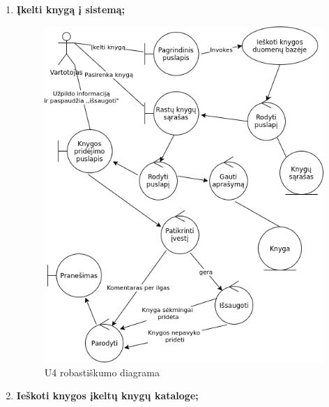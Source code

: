\documentclass{VUMIFPSkursinis}
\begin{document}
\begin{enumerate}[label=\textbf{U\arabic*.}]
\begin{figure}[H]
					\label{img:psi2-u3-robustness}
				\end{figure}
			\item \textbf{Įkelti knygą į sistemą;}
				\begin{figure}[H]
					\centering
					\includegraphics[scale=0.9]{img/U4.png}
					\caption{U4 robastiškumo diagrama}
					\label{img:psi2-u4-robustness}
				\end{figure}
			\item \textbf{Ieškoti knygos įkeltų knygų kataloge;}
				\begin{figure}[H]
					\centering

\end{figure}
\end{enumerate}
\end{document}
